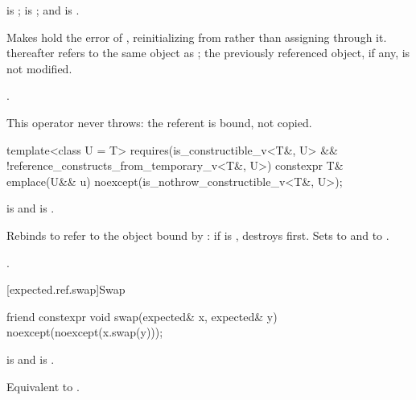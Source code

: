 \begin{itemdescr}
\pnum
\constraints
{} is ;  is ; and  is .

\pnum
\effects
Makes  hold the error of , reinitializing  from  rather than assigning through it.  thereafter refers to the same object as ; the previously referenced object, if any, is not modified.

\pnum
\returns
{}.

\pnum
\remarks
This operator never throws: the referent is bound, not copied.
\end{itemdescr}

%
\begin{itemdecl}
template<class U = T>
  requires(is_constructible_v<T&, U> && !reference_constructs_from_temporary_v<T&, U>)
constexpr T& emplace(U&& u) noexcept(is_nothrow_constructible_v<T&, U>);
\end{itemdecl}

\begin{itemdescr}
\pnum
\constraints
{} is  and  is .

\pnum
\effects
Rebinds  to refer to the object bound by : if  is , destroys  first. Sets  to  and  to .

\pnum
\returns
{}.
\end{itemdescr}

[expected.ref.swap]{Swap}

%
\begin{itemdecl}
friend constexpr void swap(expected& x, expected& y) noexcept(noexcept(x.swap(y)));
\end{itemdecl}

\begin{itemdescr}
\pnum
\constraints
{} is  and  is .

\pnum
\effects
Equivalent to .
\end{itemdescr}

